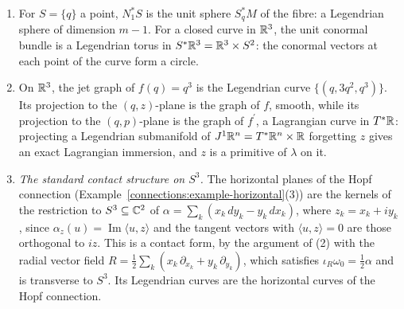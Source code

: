 \begin{example}\label{symplectic-geometry:example-contact}
\begin{enumerate}
\item For $S = \{q\}$ a point, $N^*_1S$ is the unit sphere $S^*_qM$ of the fibre: a Legendrian sphere of dimension $m - 1$. For a closed curve in $\mathbb{R}^3$, the unit conormal bundle is a Legendrian torus in
$S^*\mathbb{R}^3 = \mathbb{R}^3 \times S^2$: the conormal vectors at each point of the curve form a circle.
\item On $\mathbb{R}^3$, the jet graph of $f(q) = q^3$ is the Legendrian curve $\{(q, 3q^2, q^3)\}$. Its projection to the $(q, z)$-plane is the graph of $f$, smooth, while its projection to the $(q, p)$-plane is the
graph of $f^{\prime}$, a Lagrangian curve in $T^*\mathbb{R}$: projecting a Legendrian submanifold of $J^1\mathbb{R}^n = T^*\mathbb{R}^n \times \mathbb{R}$ forgetting $z$ gives an exact Lagrangian immersion, and $z$ is a primitive of
$\lambda$ on it.
\item \emph{The standard contact structure on $S^3$.} The horizontal planes of the Hopf connection (Example~\ref{connections:example-horizontal}(3)) are the kernels of the restriction to $S^3 \subseteq \mathbb{C}^2$ of
$\alpha = \sum_k(x_k\,dy_k - y_k\,dx_k)$, where $z_k = x_k + iy_k$, since $\alpha_z(u) = \operatorname{Im}\langle u, z\rangle$ and the tangent vectors with $\langle u, z\rangle = 0$ are those orthogonal to $iz$. This is a contact
form, by the argument of (2) with the radial vector field $R = \frac12\sum_k(x_k\,\partial_{x_k} + y_k\,\partial_{y_k})$, which satisfies $\iota_R\omega_0 = \frac12\alpha$ and is transverse to $S^3$. Its Legendrian curves are the
horizontal curves of the Hopf connection.
\end{enumerate}
\end{example}

